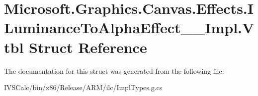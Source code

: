 \hypertarget{struct_microsoft_1_1_graphics_1_1_canvas_1_1_effects_1_1_i_luminance_to_alpha_effect_____impl_1_1_vtbl}{}\section{Microsoft.\+Graphics.\+Canvas.\+Effects.\+I\+Luminance\+To\+Alpha\+Effect\+\_\+\+\_\+\+Impl.\+Vtbl Struct Reference}
\label{struct_microsoft_1_1_graphics_1_1_canvas_1_1_effects_1_1_i_luminance_to_alpha_effect_____impl_1_1_vtbl}


The documentation for this struct was generated from the following file\+:\begin{DoxyCompactItemize}
\item 
I\+V\+S\+Calc/bin/x86/\+Release/\+A\+R\+M/ilc/Impl\+Types.\+g.\+cs\end{DoxyCompactItemize}
